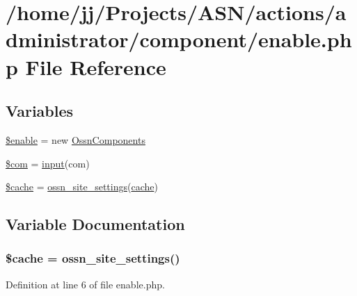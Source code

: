 \hypertarget{component_2enable_8php}{}\section{/home/jj/\+Projects/\+A\+S\+N/actions/administrator/component/enable.php File Reference}
\label{component_2enable_8php}
\subsection*{Variables}
\begin{DoxyCompactItemize}
\item 
\hyperlink{component_2enable_8php_abea865f3ca62b18578d7a0ca285d216e}{\$enable} = new \hyperlink{class_ossn_components}{Ossn\+Components}
\item 
\hyperlink{component_2enable_8php_aeb238dc1f5c0181fea3117fd9ba0429f}{\$com} = \hyperlink{ossn_8lib_8input_8php_a64ebee98b041c4f75f71ed3cd73cc8ed}{input}(\textquotesingle{}com\textquotesingle{})
\item 
\hyperlink{component_2enable_8php_ac2dc76d756ec398393d4b1d23659276c}{\$cache} = \hyperlink{ossn_8lib_8system_8php_a610e2045b8a86c09f777b4d82e24e34c}{ossn\+\_\+site\+\_\+settings}(\textquotesingle{}\hyperlink{jquery_8tokeninput_8js_a521016aa0ca9ff38bfba60ab069cb34b}{cache}\textquotesingle{})
\end{DoxyCompactItemize}


\subsection{Variable Documentation}
\subsubsection[{\texorpdfstring{\$cache}{$cache}}]{\setlength{\rightskip}{0pt plus 5cm}\${\bf cache} = {\bf ossn\+\_\+site\+\_\+settings}(\textquotesingle{})}\hypertarget{component_2enable_8php_ac2dc76d756ec398393d4b1d23659276c}{}\label{component_2enable_8php_ac2dc76d756ec398393d4b1d23659276c}


Definition at line 6 of file enable.\+php.


